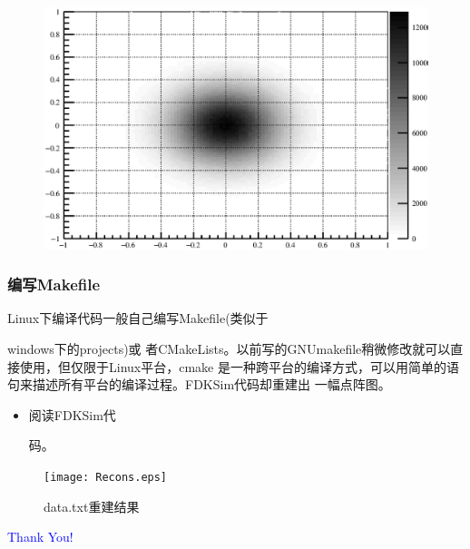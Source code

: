 \documentclass{beamer}
\newcommand{\yihao}{\fontsize{30pt}{\baselineskip}\selectfont}
\newcommand{\liuhao}{\fontsize{7.875pt}{\baselineskip}\selectfont}
\newcommand{\ThankYouPage}{
  \begin{frame}
    \yihao \centering \textcolor{blue}
    {Thank You!}
  \end{frame}
}
\begin{document}
\begin{CJK*}{UTF8}{gkai}
\begin{frame}
\begin{minipage}[t]{0.5\textwidth}
\begin{figure}[ht]
	\includegraphics[width=\textwidth]{TestGrayStyleBack.eps}
      \end{figure}
    \end{minipage}
  \end{frame}
  \begin{frame}\frametitle{编写Makefile}
    \begin{minipage}[t]{0.3\textwidth}
      \liuhao
      Linux下编译代码一般自己编写Makefile(类似于
      
      windows下的projects)或
      者CMakeLists。以前写的GNUmakefile稍微修改就可以直接使用，但仅限于Linux平台，cmake
      是一种跨平台的编译方式，可以用简单的语句来描述所有平台的编译过程。FDKSim代码却重建出
      一幅点阵图。
      \begin{itemize}
	\item 阅读FDKSim代
	  
	  码。
      \end{itemize}
    \end{minipage}
    \begin{minipage}[t]{0.7\textwidth}
      \begin{figure}[ht]
        \texttt{[image: Recons.eps]}
	\caption{\liuhao data.txt重建结果} 
      \end{figure}
    \end{minipage}
  \end{frame}
  \ThankYouPage
\end{CJK*}
\end{document}
